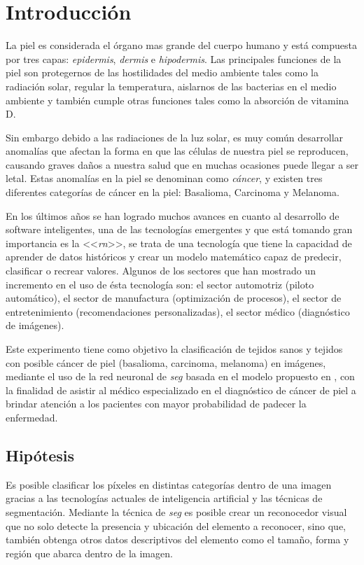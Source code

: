 
\chapter{Introducción}

La piel es considerada el órgano mas grande del cuerpo humano y está compuesta por tres capas: \emph{\gls{epidermis}}, \emph{\gls{dermis}} e \emph{\gls{hipodermis}}. Las principales funciones de la piel son protegernos de las hostilidades del medio ambiente tales como la radiación solar,  regular la temperatura, aislarnos de las bacterias en el medio ambiente y también cumple otras funciones tales como la absorción de vitamina D.

Sin embargo debido a las radiaciones de la luz solar, es muy común desarrollar anomalías que afectan la forma en que las células de nuestra piel se reproducen, causando graves daños a nuestra salud que en muchas ocasiones puede llegar a ser letal. Estas anomalías en la piel se denominan como \emph{cáncer}, y existen tres diferentes categorías de cáncer en la piel: Basalioma, Carcinoma y Melanoma.

En los últimos años se han logrado muchos avances en cuanto al desarrollo de software inteligentes, una de las tecnologías emergentes y que está tomando gran importancia es la <<\emph{\gls{rn}}>>, se trata de una tecnología que tiene la capacidad de aprender de datos históricos y crear un modelo matemático capaz de predecir, clasificar o recrear valores. Algunos de los sectores que han mostrado un incremento en el uso de ésta tecnología son: el sector automotriz (piloto automático), el sector de manufactura (optimización de procesos), el sector de entretenimiento (recomendaciones personalizadas), el sector médico (diagnóstico de imágenes). 

Este experimento tiene como objetivo la clasificación de tejidos sanos y tejidos con posible cáncer de piel (basalioma, carcinoma, melanoma) en imágenes, mediante el uso de la red neuronal de \emph{\gls{seg}} basada en el modelo propuesto en \citealt{wu2019fastfcn}, con la finalidad de asistir al médico especializado en el diagnóstico de cáncer de piel a brindar atención a los pacientes con mayor probabilidad de padecer la enfermedad.

\section{Hipótesis}
Es posible clasificar los píxeles en distintas categorías dentro de una imagen gracias a las tecnologías actuales de inteligencia artificial y las técnicas de segmentación. Mediante la técnica de \emph{\gls{seg}} es posible crear un reconocedor visual que no solo detecte la presencia y ubicación del elemento a reconocer, sino que, también obtenga otros datos descriptivos del elemento como el tamaño, forma y región que abarca dentro de la imagen. 

